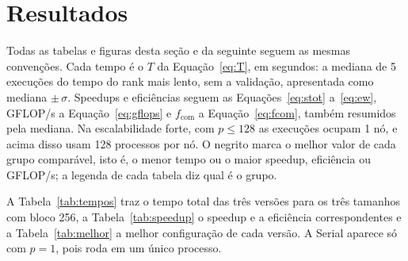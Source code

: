 \documentclass[Portugues]{ic-tese-v3}
\DeclareRobustCommand{\_}{\textunderscore\allowbreak} %
\begin{document}
\section{Resultados}
Todas as tabelas e figuras desta seção e da seguinte seguem as mesmas convenções. Cada tempo é o $T$ da Equação~\eqref{eq:T}, em segundos: a mediana de 5 execuções do tempo do rank mais lento, sem a validação, apresentada como mediana $\pm\,\sigma$. Speedups e eficiências seguem as Equações~\eqref{eq:stot} a~\eqref{eq:ew}, GFLOP/s a Equação~\eqref{eq:gflops} e $f_{\mathrm{com}}$ a Equação~\eqref{eq:fcom}, também resumidos pela mediana. Na escalabilidade forte, com $p\le 128$ as execuções ocupam 1 nó, e acima disso usam 128 processos por nó. O negrito marca o melhor valor de cada grupo comparável, isto é, o menor tempo ou o maior speedup, eficiência ou GFLOP/s; a legenda de cada tabela diz qual é o grupo.

A Tabela~\ref{tab:tempos} traz o tempo total das três versões para os três tamanhos com bloco 256, a Tabela~\ref{tab:speedup} o speedup e a eficiência correspondentes e a Tabela~\ref{tab:melhor} a melhor configuração de cada versão. A Serial aparece só com $p=1$, pois roda em um único processo.
\end{document}
